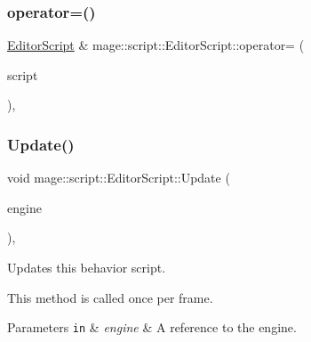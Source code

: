 \mbox{\label{classmage_1_1script_1_1_editor_script_a87df2b20fee97f6aa9e09b4b5c9282a5}} 
\subsubsection{\texorpdfstring{operator=()}{operator=()}\hspace{0.1cm}{\footnotesize\ttfamily [2/2]}}
{\footnotesize\ttfamily \mbox{\hyperlink{classmage_1_1script_1_1_editor_script}{Editor\+Script}} \& mage\+::script\+::\+Editor\+Script\+::operator= (\begin{DoxyParamCaption}\item[{\mbox{\hyperlink{classmage_1_1script_1_1_editor_script}{Editor\+Script}} \&\&}]{script }\end{DoxyParamCaption})\hspace{0.3cm}{\ttfamily [default]}, {\ttfamily [noexcept]}}

\mbox{\label{classmage_1_1script_1_1_editor_script_a311532d499edfaf3f74aa598fb87ec8e}} 
\subsubsection{\texorpdfstring{Update()}{Update()}}
{\footnotesize\ttfamily void mage\+::script\+::\+Editor\+Script\+::\+Update (\begin{DoxyParamCaption}\item[{\mbox{[}\mbox{[}maybe\+\_\+unused\mbox{]} \mbox{]} \mbox{\hyperlink{classmage_1_1_engine}{Engine}} \&}]{engine }\end{DoxyParamCaption})\hspace{0.3cm}{\ttfamily [override]}, {\ttfamily [virtual]}}

Updates this behavior script.

This method is called once per frame.


\begin{DoxyParams}[1]{Parameters}
\mbox{\tt in}  & {\em engine} & A reference to the engine. \\
\hline
\end{DoxyParams}

